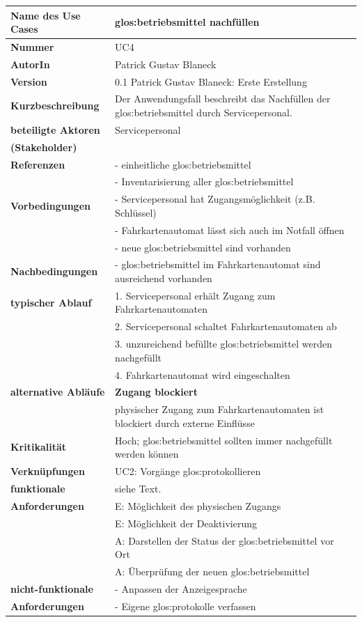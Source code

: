 \documentclass{lastenheft}
\begin{document}
\begin{xltabular}{\linewidth}{|>{\bfseries}p{4cm}|X|}
    \hline
    Name des Use Cases & \gls{glos:betriebsmittel} nachfüllen \\
    \hline
    Nummer & UC4 \\
    \hline
    AutorIn & Patrick Gustav Blaneck \\
    \hline
    Version & 0.1 Patrick Gustav Blaneck: Erste Erstellung \\
    \hline
    Kurzbeschreibung & Der Anwendungsfall beschreibt das Nachfüllen der \gls{glos:betriebsmittel} durch Servicepersonal.\\
    \hline
    beteiligte Aktoren & Servicepersonal\\
    (Stakeholder) & \\
    \hline
    Referenzen & - einheitliche \gls{glos:betriebsmittel} \\
    & - Inventarisierung aller \gls{glos:betriebsmittel} \\
    \hline
    Vorbedingungen & - Servicepersonal hat Zugangsmöglichkeit (z.B. Schlüssel) \\
    & - Fahrkartenautomat lässt sich auch im Notfall öffnen \\
    & - neue \gls{glos:betriebsmittel} sind vorhanden \\
    \hline
    Nachbedingungen & - \gls{glos:betriebsmittel} im Fahrkartenautomat sind ausreichend vorhanden \\
    \hline
    typischer Ablauf & 1. Servicepersonal erhält Zugang zum Fahrkartenautomaten \\
    & 2. Servicepersonal schaltet Fahrkartenautomaten ab \\
    & 3. unzureichend befüllte \gls{glos:betriebsmittel} werden nachgefüllt \\
    & 4. Fahrkartenautomat wird eingeschalten \\
    \hline
    alternative Abläufe & \textbf{Zugang blockiert} \\
    & physischer Zugang zum Fahrkartenautomaten ist blockiert durch externe Einflüsse \\
    \hline
    Kritikalität & Hoch; \gls{glos:betriebsmittel} sollten immer nachgefüllt werden können \\
    \hline
    Verknüpfungen & UC2: Vorgänge \gls{glos:protokollieren} \\
    \hline
    funktionale & siehe Text. \\
    Anforderungen & E: Möglichkeit des physischen Zugangs \\
    & E: Möglichkeit der Deaktivierung \\
    & A: Darstellen der Status der \gls{glos:betriebsmittel} vor Ort \\
    & A: Überprüfung der neuen \gls{glos:betriebsmittel} \\
    \hline
    nicht-funktionale & - Anpassen der Anzeigesprache \\
    Anforderungen & - Eigene \gls{glos:protokoll}e verfassen \\
    \hline
\end{xltabular}
\end{document}
